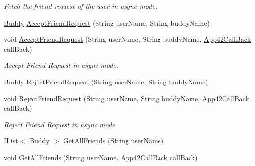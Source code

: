 \begin{DoxyCompactItemize}
\begin{DoxyCompactList}\small\item\em Fetch the friend request of the user in async mode. \end{DoxyCompactList}\item 
\hyperlink{classcom_1_1shephertz_1_1app42_1_1paas_1_1sdk_1_1csharp_1_1buddy_1_1_buddy}{Buddy} \hyperlink{classcom_1_1shephertz_1_1app42_1_1paas_1_1sdk_1_1csharp_1_1buddy_1_1_buddy_service_ac87657a236fde2437de03606a1ca9af9}{Accept\+Friend\+Request} (String user\+Name, String buddy\+Name)
\item 
void \hyperlink{classcom_1_1shephertz_1_1app42_1_1paas_1_1sdk_1_1csharp_1_1buddy_1_1_buddy_service_a49d3221bc877731c493f9d7940d5244c}{Accept\+Friend\+Request} (String user\+Name, String buddy\+Name, \hyperlink{interfacecom_1_1shephertz_1_1app42_1_1paas_1_1sdk_1_1csharp_1_1_app42_call_back}{App42\+Call\+Back} call\+Back)
\begin{DoxyCompactList}\small\item\em Accept Friend Request in async mode. \end{DoxyCompactList}\item 
\hyperlink{classcom_1_1shephertz_1_1app42_1_1paas_1_1sdk_1_1csharp_1_1buddy_1_1_buddy}{Buddy} \hyperlink{classcom_1_1shephertz_1_1app42_1_1paas_1_1sdk_1_1csharp_1_1buddy_1_1_buddy_service_a72c7541c29e46574ee57ba95507d514f}{Reject\+Friend\+Request} (String user\+Name, String buddy\+Name)
\item 
void \hyperlink{classcom_1_1shephertz_1_1app42_1_1paas_1_1sdk_1_1csharp_1_1buddy_1_1_buddy_service_a2a46cd98f5d5e989d8beac76c6c767fe}{Reject\+Friend\+Request} (String user\+Name, String buddy\+Name, \hyperlink{interfacecom_1_1shephertz_1_1app42_1_1paas_1_1sdk_1_1csharp_1_1_app42_call_back}{App42\+Call\+Back} call\+Back)
\begin{DoxyCompactList}\small\item\em Reject Friend Request in async mode \end{DoxyCompactList}\item 
I\+List$<$ \hyperlink{classcom_1_1shephertz_1_1app42_1_1paas_1_1sdk_1_1csharp_1_1buddy_1_1_buddy}{Buddy} $>$ \hyperlink{classcom_1_1shephertz_1_1app42_1_1paas_1_1sdk_1_1csharp_1_1buddy_1_1_buddy_service_a92267bd1c358a3374c2fc6751346ff93}{Get\+All\+Friends} (String user\+Name)
\item 
void \hyperlink{classcom_1_1shephertz_1_1app42_1_1paas_1_1sdk_1_1csharp_1_1buddy_1_1_buddy_service_aacb368a741699c2c193967c18aa7e0bf}{Get\+All\+Friends} (String user\+Name, \hyperlink{interfacecom_1_1shephertz_1_1app42_1_1paas_1_1sdk_1_1csharp_1_1_app42_call_back}{App42\+Call\+Back} call\+Back)

\end{DoxyCompactItemize}
